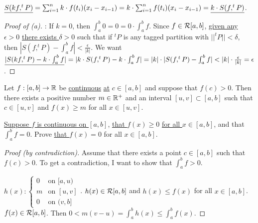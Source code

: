\documentclass[]{article}
\begin{document}
$\underline{S(kf,^tP)} = \sum_{i=1}^n k\cdot f(t_i)(x_i-x_{i-1}) = k\cdot \sum_{i=1}^n f(t_i)(x_i-x_{i-1}) = \underline{k\cdot S(f,^tP)}$.

\begin{proof}
	[Proof of (a)]: If $k=0$, then $\int_a^b0 =0 = 0\cdot \int_a^b f$. Since $f\in\mathcal{R}[a,b]$, \ul{given any $\epsilon>0$} \ul{there exists $\delta>0$} such that if $^tP$ is any tagged partition with \ul{$||^tP||<\delta$}, then \ul{$|S(f,^tP)-\int_a^b f|<\frac{\epsilon}{|k|}$}. We want $\underline{|S(kf,^tP)-k\cdot \int_a^b f}| = |k\cdot S(f,^tP)-k\cdot \int_a^b f| = |k|\cdot |S(f,^tP)-\int_a^b f| < |k|\cdot \frac{\epsilon}{|k|} = \epsilon$.
\end{proof}

\begin{recall}
	[Problem \#1 HW \#5] Let $f:[a,b]\rightarrow\mathbb{R}$ be \ul{continuous} \ul{at} \ul{$c\in[a,b]$} and suppose that \ul{$f(c)>0$}. Then there exists a positive number $m\in\mathbb{R}^+$ and an interval $[u,v] \subset [a,b]$ such that $c\in[u,v]$ and $f(x)\geq m$ for all $x\in[u,v]$.
\end{recall}
\begin{example}
	[\ul{HW \# 6 \#3}] \ul{Suppose $f$ is continuous on $[a,b]$}, \ul{that $f(x)\geq 0$} \ul{for all $x\in[a,b]$}, and that $\int_a^b f = 0$. Prove \ul{that $f(x) = 0$} for all $x\in[a,b]$.
		\begin{proof}
			[Proof (by contradiction)] Assume that there exists a point \ul{$c\in[a,b]$} such that $f(c)>0$. To get a contradiction, I want to show that $\int_a^b f>0$.
			
			$h(x) : \begin{cases} 0 & \text{on }[a,u) \\ m & \text{on }[u,v] \\ 0 & \text{on }(v,b] \end{cases}$. $h(x)\in\mathcal{R}[a,b]$ and $h(x)\leq f(x)$ for all $x\in[a,b]$. $f(x)\in\mathcal{R}[a,b]$. Then $0< m(v-u) = \int_a^b h(x) \leq \int_a^b f(x)$.
		\end{proof}
\end{example}
\end{document}
